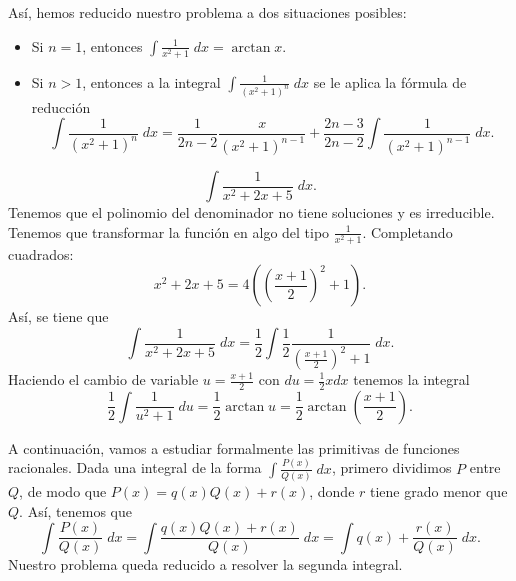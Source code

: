 Así, hemos reducido nuestro problema a dos situaciones posibles:
\begin{itemize}
\item Si $\displaystyle n = 1 $, entonces $\displaystyle \int \frac{1}{x^{2}+1} \; dx = \arctan x $.
\item Si $\displaystyle n > 1 $, entonces a la integral $\displaystyle \int \frac{1}{\left(x^{2}+1\right)^{n}} \; dx $ se le aplica la fórmula de reducción
	\[\int \frac{1}{\left(x^{2}+1\right)^{n}} \; dx = \frac{1}{2n-2}\frac{x}{\left(x^{2}+1\right)^{n-1}}+\frac{2n-3}{2n-2}\int \frac{1}{\left(x^{2}+1\right)^{n-1}} \; dx .\]
\end{itemize}
\begin{eg}
\normalfont 
\[\int \frac{1}{x^{2}+2x+5} \; dx .\]
Tenemos que el polinomio del denominador no tiene soluciones y es irreducible. Tenemos que transformar la función en algo del tipo $\displaystyle \frac{1}{x^{2}+1} $. Completando cuadrados:
\[ x^{2}+2x+5 = 4\left(\left(\frac{x+1}{2}\right)^{2}+1\right) .\]
Así, se tiene que
\[ \int \frac{1}{x^{2}+2x+5} \; dx = \frac{1}{2}\int \frac{1}{2}\frac{1}{\left(\frac{x+1}{2}\right)^{2}+1} \; dx.\]
Haciendo el cambio de variable $\displaystyle u = \frac{x+1}{2} $ con $\displaystyle du = \frac{1}{2}x dx $ tenemos la integral
\[ \frac{1}{2}\int \frac{1}{u^{2}+1} \; du = \frac{1}{2}\arctan u = \frac{1}{2}\arctan \left(\frac{x+1}{2}\right) .\]
\end{eg}
A continuación, vamos a estudiar formalmente las primitivas de funciones racionales. Dada una integral de la forma $\displaystyle \int \frac{P\left(x\right)}{Q\left(x\right)} \; dx $, primero dividimos $\displaystyle P $ entre $\displaystyle Q $, de modo que $\displaystyle P\left(x\right) = q\left(x\right)Q\left(x\right) + r\left(x\right) $, donde $\displaystyle r $ tiene grado menor que $\displaystyle Q $. Así, tenemos que
\[\int \frac{P\left(x\right)}{Q\left(x\right)} \; dx = \int \frac{q\left(x\right)Q\left(x\right) + r\left(x\right)}{Q\left(x\right)} \; dx = \int q\left(x\right) + \frac{r\left(x\right)}{Q\left(x\right)} \; dx .\]
Nuestro problema queda reducido a resolver la segunda integral. 

